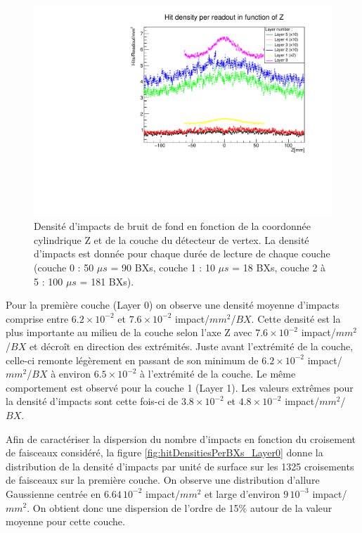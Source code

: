   \begin{figure}[!htb]
    \begin{center}
      \includegraphics[scale=0.60]{./figures/Beamstrahlung/hitDensities_vs_Z_Per_Readout_AllLayers.pdf}
      \caption{Densit\'e d'impacts de bruit de fond en fonction de la coordonn\'ee cylindrique Z et de la couche du d\'etecteur de vertex. La densit\'e d'impacts est donn\'ee pour chaque dur\'ee de lecture de chaque couche (couche 0 : 50 $\mu s$ = 90 BXs, couche 1 : 10 $\mu s$ = 18 BXs, couche 2 \`a 5 : 100 $\mu s$ = 181 BXs).}
      \label{fig:hitDensitiesVsZ_AllLayers_Readout}
    \end{center}
  \end{figure}
 
 \medskip
 
 Pour la premi\`ere couche (Layer 0) on observe une densit\'e moyenne d'impacts comprise entre $6.2 \times 10^{-2}$ et $7.6 \times 10^{-2}$ impact/$mm^2$/$BX$. Cette densit\'e est la plus importante au milieu de la couche selon l'axe Z avec $7.6 \times 10^{-2}$ impact/$mm^2$/$BX$ et décroît en direction des extr\'emit\'es. Juste avant l'extr\'emit\'e de la couche, celle-ci remonte l\'eg\`erement en passant de son minimum de $6.2 \times 10^{-2}$ impact/$mm^2$/$BX$ \`a environ $6.5 \times 10^{-2}$ \`a l'extr\'emité de la couche. Le m\^eme comportement est observ\'e pour la couche 1 (Layer 1). Les valeurs extr\^emes pour la densit\'e d'impacts sont cette fois-ci de $3.8 \times 10^{-2}$ et $4.8 \times 10^{-2}$ impact/$mm^2$/$BX$. 
 
 \medskip
 
 Afin de caract\'eriser la dispersion du nombre d'impacts en fonction du croisement de faisceaux consid\'er\'e, la figure \ref{fig:hitDensitiesPerBXs_Layer0} donne la distribution de la densit\'e d'impacts par unit\'e de surface sur les 1325 croisements de faisceaux sur la premi\`ere couche. On observe une distribution d'allure Gaussienne centr\'ee en $6.64 \, 10^{-2}$ impact/$mm^2$ et large d'environ $9 \, 10^{-3}$ impact/$mm^2$. On obtient donc une dispersion de l'ordre de 15$\%$ autour de la valeur moyenne pour cette couche.
 
